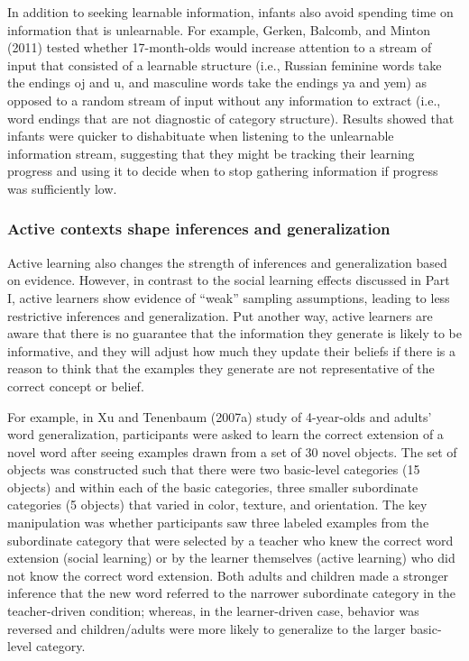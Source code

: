 \documentclass[english,floatsintext,man]{apa6}
\theoremstyle{definition}
\theoremstyle{definition}
\theoremstyle{definition}
\theoremstyle{remark}
\begin{document}
In addition to seeking learnable information, infants also avoid
spending time on information that is unlearnable. For example, Gerken,
Balcomb, and Minton (2011) tested whether 17-month-olds would increase
attention to a stream of input that consisted of a learnable structure
(i.e., Russian feminine words take the endings oj and u, and masculine
words take the endings ya and yem) as opposed to a random stream of
input without any information to extract (i.e., word endings that are
not diagnostic of category structure). Results showed that infants were
quicker to dishabituate when listening to the unlearnable information
stream, suggesting that they might be tracking their learning progress
and using it to decide when to stop gathering information if progress
was sufficiently low.

\subsubsection{Active contexts shape inferences and
generalization}\label{active-contexts-shape-inferences-and-generalization}

Active learning also changes the strength of inferences and
generalization based on evidence. However, in contrast to the social
learning effects discussed in Part I, active learners show evidence of
\enquote{weak} sampling assumptions, leading to less restrictive
inferences and generalization. Put another way, active learners are
aware that there is no guarantee that the information they generate is
likely to be informative, and they will adjust how much they update
their beliefs if there is a reason to think that the examples they
generate are not representative of the correct concept or belief.

For example, in Xu and Tenenbaum (2007a) study of 4-year-olds and
adults' word generalization, participants were asked to learn the
correct extension of a novel word after seeing examples drawn from a set
of 30 novel objects. The set of objects was constructed such that there
were two basic-level categories (15 objects) and within each of the
basic categories, three smaller subordinate categories (5 objects) that
varied in color, texture, and orientation. The key manipulation was
whether participants saw three labeled examples from the subordinate
category that were selected by a teacher who knew the correct word
extension (social learning) or by the learner themselves (active
learning) who did not know the correct word extension. Both adults and
children made a stronger inference that the new word referred to the
narrower subordinate category in the teacher-driven condition; whereas,
in the learner-driven case, behavior was reversed and children/adults
were more likely to generalize to the larger basic-level category.
\end{document}
